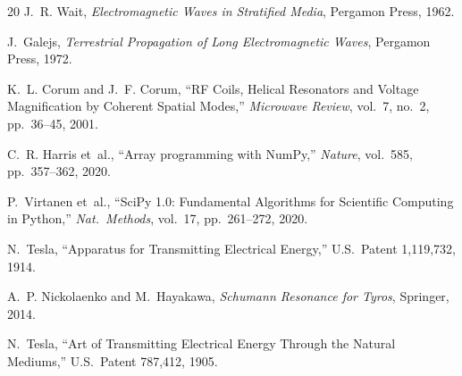 \documentclass[12pt,a4paper]{article}
\begin{document}
\begin{thebibliography}{20}
J.~R. Wait, \emph{Electromagnetic Waves in Stratified Media}, Pergamon Press, 1962.

J.~Galejs, \emph{Terrestrial Propagation of Long Electromagnetic Waves}, Pergamon Press, 1972.

K.~L. Corum and J.~F. Corum, ``RF Coils, Helical Resonators and Voltage Magnification by Coherent Spatial Modes,'' \emph{Microwave Review}, vol.~7, no.~2, pp.~36--45, 2001.

C.~R. Harris et~al., ``Array programming with NumPy,'' \emph{Nature}, vol.~585, pp.~357--362, 2020.

P.~Virtanen et~al., ``SciPy 1.0: Fundamental Algorithms for Scientific Computing in Python,'' \emph{Nat.\ Methods}, vol.~17, pp.~261--272, 2020.

N.~Tesla, ``Apparatus for Transmitting Electrical Energy,'' U.S.\ Patent 1,119,732, 1914.

A.~P. Nickolaenko and M.~Hayakawa, \emph{Schumann Resonance for Tyros}, Springer, 2014.

N.~Tesla, ``Art of Transmitting Electrical Energy Through the Natural Mediums,'' U.S.\ Patent 787,412, 1905.

\end{thebibliography}
\end{document}
